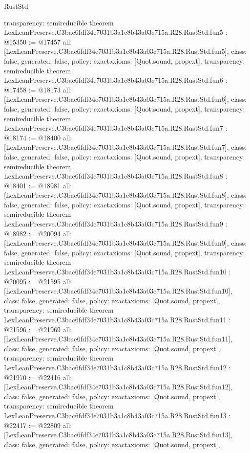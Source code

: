 \begin{lexlean}{RustStd}
\begin{coremodule}
{  transparency: semireducible
}
theorem LexLeanPreserve.C3bac6fdf34e7031b3a1c8b43a03c715a.R28.RustStd.fun5 : @15350 := @17457 {
  all: [LexLeanPreserve.C3bac6fdf34e7031b3a1c8b43a03c715a.R28.RustStd.fun5],
  class: false,
  generated: false,
  policy: exact{axioms: [Quot.sound, propext]},
  transparency: semireducible
}
theorem LexLeanPreserve.C3bac6fdf34e7031b3a1c8b43a03c715a.R28.RustStd.fun6 : @17458 := @18173 {
  all: [LexLeanPreserve.C3bac6fdf34e7031b3a1c8b43a03c715a.R28.RustStd.fun6],
  class: false,
  generated: false,
  policy: exact{axioms: [Quot.sound, propext]},
  transparency: semireducible
}
theorem LexLeanPreserve.C3bac6fdf34e7031b3a1c8b43a03c715a.R28.RustStd.fun7 : @18174 := @18400 {
  all: [LexLeanPreserve.C3bac6fdf34e7031b3a1c8b43a03c715a.R28.RustStd.fun7],
  class: false,
  generated: false,
  policy: exact{axioms: [Quot.sound, propext]},
  transparency: semireducible
}
theorem LexLeanPreserve.C3bac6fdf34e7031b3a1c8b43a03c715a.R28.RustStd.fun8 : @18401 := @18981 {
  all: [LexLeanPreserve.C3bac6fdf34e7031b3a1c8b43a03c715a.R28.RustStd.fun8],
  class: false,
  generated: false,
  policy: exact{axioms: [Quot.sound, propext]},
  transparency: semireducible
}
theorem LexLeanPreserve.C3bac6fdf34e7031b3a1c8b43a03c715a.R28.RustStd.fun9 : @18982 := @20094 {
  all: [LexLeanPreserve.C3bac6fdf34e7031b3a1c8b43a03c715a.R28.RustStd.fun9],
  class: false,
  generated: false,
  policy: exact{axioms: [Quot.sound, propext]},
  transparency: semireducible
}
theorem LexLeanPreserve.C3bac6fdf34e7031b3a1c8b43a03c715a.R28.RustStd.fun10 : @20095 := @21595 {
  all: [LexLeanPreserve.C3bac6fdf34e7031b3a1c8b43a03c715a.R28.RustStd.fun10],
  class: false,
  generated: false,
  policy: exact{axioms: [Quot.sound, propext]},
  transparency: semireducible
}
theorem LexLeanPreserve.C3bac6fdf34e7031b3a1c8b43a03c715a.R28.RustStd.fun11 : @21596 := @21969 {
  all: [LexLeanPreserve.C3bac6fdf34e7031b3a1c8b43a03c715a.R28.RustStd.fun11],
  class: false,
  generated: false,
  policy: exact{axioms: [Quot.sound, propext]},
  transparency: semireducible
}
theorem LexLeanPreserve.C3bac6fdf34e7031b3a1c8b43a03c715a.R28.RustStd.fun12 : @21970 := @22416 {
  all: [LexLeanPreserve.C3bac6fdf34e7031b3a1c8b43a03c715a.R28.RustStd.fun12],
  class: false,
  generated: false,
  policy: exact{axioms: [Quot.sound, propext]},
  transparency: semireducible
}
theorem LexLeanPreserve.C3bac6fdf34e7031b3a1c8b43a03c715a.R28.RustStd.fun13 : @22417 := @22809 {
  all: [LexLeanPreserve.C3bac6fdf34e7031b3a1c8b43a03c715a.R28.RustStd.fun13],
  class: false,
  generated: false,
  policy: exact{axioms: [Quot.sound, propext]},
}
\end{coremodule}
\end{lexlean}
